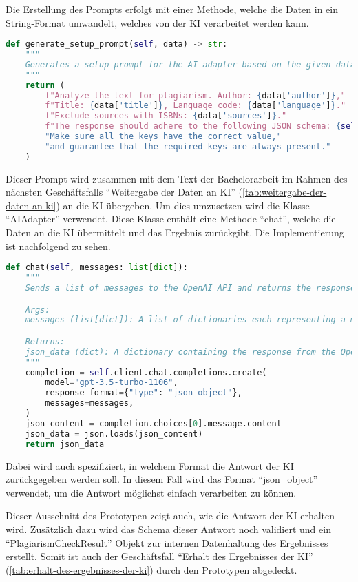 Die Erstellung des Prompts erfolgt mit einer Methode, welche die Daten in ein String-Format umwandelt,
welches von der KI verarbeitet werden kann.
\begin{lstlisting}[caption={Erstellung eines Prompts für die KI},captionpos=b,label={lst:prompt-erstellen}, language=Python, breaklines=true]
def generate_setup_prompt(self, data) -> str:
    """
    Generates a setup prompt for the AI adapter based on the given data.
    """
    return (
        f"Analyze the text for plagiarism. Author: {data['author']},"
        f"Title: {data['title']}, Language code: {data['language']}."
        f"Exclude sources with ISBNs: {data['sources']}."
        f"The response should adhere to the following JSON schema: {self.schema}"
        "Make sure all the keys have the correct value,"
        "and guarantee that the required keys are always present."
    )
\end{lstlisting}

Dieser Prompt wird zusammen mit dem Text der Bachelorarbeit im Rahmen des nächsten Geschäftsfalls
``Weitergabe der Daten an KI'' (\ref{tab:weitergabe-der-daten-an-ki}) an die KI übergeben.
Um dies umzusetzen wird die Klasse ``AIAdapter'' verwendet.
Diese Klasse enthält eine Methode ``chat'', welche die Daten an die KI übermittelt und das Ergebnis zurückgibt.
Die Implementierung ist nachfolgend zu sehen.
\begin{lstlisting}[caption={Weitergabe der Daten an KI},captionpos=b,label={lst:weitergabe-an-ki}, language=Python, breaklines=true]
def chat(self, messages: list[dict]):
    """
    Sends a list of messages to the OpenAI API and returns the response.

    Args:
    messages (list[dict]): A list of dictionaries each representing a message.

    Returns:
    json_data (dict): A dictionary containing the response from the OpenAI API.
    """
    completion = self.client.chat.completions.create(
        model="gpt-3.5-turbo-1106",
        response_format={"type": "json_object"},
        messages=messages,
    )
    json_content = completion.choices[0].message.content
    json_data = json.loads(json_content)
    return json_data
\end{lstlisting}

Dabei wird auch spezifiziert, in welchem Format die Antwort der KI zurückgegeben werden soll.
In diesem Fall wird das Format ``json\_object'' verwendet, um die Antwort möglichst einfach verarbeiten zu können.

Dieser Ausschnitt des Prototypen zeigt auch, wie die Antwort der KI erhalten wird.
Zusätzlich dazu wird das Schema dieser Antwort noch validiert und ein ``PlagiarismCheckResult''
Objekt zur internen Datenhaltung des Ergebnisses erstellt.
Somit ist auch der Geschäftsfall ``Erhalt des Ergebnisses der KI'' (\ref{tab:erhalt-des-ergebnisses-der-ki}) durch den Prototypen abgedeckt.

